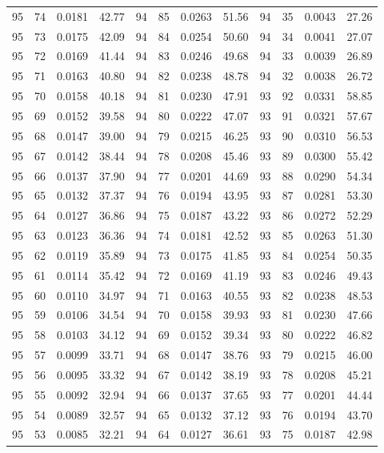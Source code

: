 \begin{tabular}{llll|llll|llll}
95 & 74 & 0.0181 & 42.77 & 94 & 85 & 0.0263 & 51.56 & 94 & 35 & 0.0043 & 27.26\\
95 & 73 & 0.0175 & 42.09 & 94 & 84 & 0.0254 & 50.60 & 94 & 34 & 0.0041 & 27.07\\
95 & 72 & 0.0169 & 41.44 & 94 & 83 & 0.0246 & 49.68 & 94 & 33 & 0.0039 & 26.89\\
95 & 71 & 0.0163 & 40.80 & 94 & 82 & 0.0238 & 48.78 & 94 & 32 & 0.0038 & 26.72\\
95 & 70 & 0.0158 & 40.18 & 94 & 81 & 0.0230 & 47.91 & 93 & 92 & 0.0331 & 58.85\\
95 & 69 & 0.0152 & 39.58 & 94 & 80 & 0.0222 & 47.07 & 93 & 91 & 0.0321 & 57.67\\
95 & 68 & 0.0147 & 39.00 & 94 & 79 & 0.0215 & 46.25 & 93 & 90 & 0.0310 & 56.53\\
95 & 67 & 0.0142 & 38.44 & 94 & 78 & 0.0208 & 45.46 & 93 & 89 & 0.0300 & 55.42\\
95 & 66 & 0.0137 & 37.90 & 94 & 77 & 0.0201 & 44.69 & 93 & 88 & 0.0290 & 54.34\\
95 & 65 & 0.0132 & 37.37 & 94 & 76 & 0.0194 & 43.95 & 93 & 87 & 0.0281 & 53.30\\
95 & 64 & 0.0127 & 36.86 & 94 & 75 & 0.0187 & 43.22 & 93 & 86 & 0.0272 & 52.29\\
95 & 63 & 0.0123 & 36.36 & 94 & 74 & 0.0181 & 42.52 & 93 & 85 & 0.0263 & 51.30\\
95 & 62 & 0.0119 & 35.89 & 94 & 73 & 0.0175 & 41.85 & 93 & 84 & 0.0254 & 50.35\\
95 & 61 & 0.0114 & 35.42 & 94 & 72 & 0.0169 & 41.19 & 93 & 83 & 0.0246 & 49.43\\
95 & 60 & 0.0110 & 34.97 & 94 & 71 & 0.0163 & 40.55 & 93 & 82 & 0.0238 & 48.53\\
95 & 59 & 0.0106 & 34.54 & 94 & 70 & 0.0158 & 39.93 & 93 & 81 & 0.0230 & 47.66\\
95 & 58 & 0.0103 & 34.12 & 94 & 69 & 0.0152 & 39.34 & 93 & 80 & 0.0222 & 46.82\\
95 & 57 & 0.0099 & 33.71 & 94 & 68 & 0.0147 & 38.76 & 93 & 79 & 0.0215 & 46.00\\
95 & 56 & 0.0095 & 33.32 & 94 & 67 & 0.0142 & 38.19 & 93 & 78 & 0.0208 & 45.21\\
95 & 55 & 0.0092 & 32.94 & 94 & 66 & 0.0137 & 37.65 & 93 & 77 & 0.0201 & 44.44\\
95 & 54 & 0.0089 & 32.57 & 94 & 65 & 0.0132 & 37.12 & 93 & 76 & 0.0194 & 43.70\\
95 & 53 & 0.0085 & 32.21 & 94 & 64 & 0.0127 & 36.61 & 93 & 75 & 0.0187 & 42.98\\

\end{tabular}
